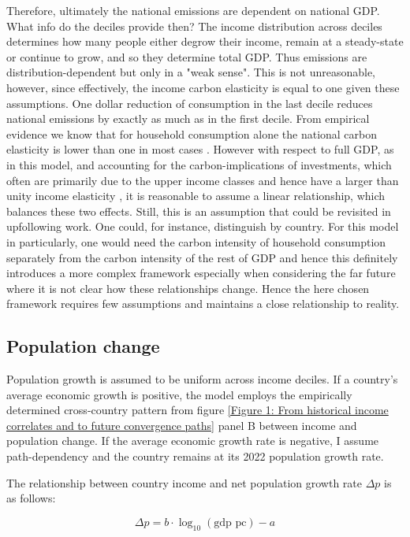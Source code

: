 \documentclass{article}
\begin{document}
Therefore, ultimately the national emissions are dependent on national GDP. What info do the deciles provide then? The income distribution across deciles determines how many people either degrow their income, remain at a steady-state or continue to grow, and so they determine total GDP. Thus emissions are distribution-dependent but only in a "weak sense". This is not unreasonable, however, since effectively, the income carbon elasticity is equal to one given these assumptions. One dollar reduction of consumption in the last decile reduces national emissions by exactly as much as in the first decile. From empirical evidence we know that for household consumption alone the national carbon elasticity is lower than one in most cases \parencite{pottier2022expenditure}.  However with respect to full GDP, as in this model, and accounting for the carbon-implications of investments, which often are primarily due to the upper income classes and hence have a larger than unity income elasticity \parencite{chancel2022global}, it is reasonable to assume a linear relationship, which balances these two effects. Still, this is an assumption that could be revisited in upfollowing work. One could, for instance, distinguish by country. For this model in particularly, one would need the carbon intensity of household consumption separately from the carbon intensity of the rest of GDP and hence this definitely introduces a more complex framework especially when considering the far future where it is not clear how these relationships change. Hence the here chosen framework requires few assumptions and maintains a close relationship to reality.

\subsection{Population change}\label{Population change}

Population growth is assumed to be uniform across income deciles. If a country's average economic growth is positive, the model employs the empirically determined cross-country pattern from figure \ref{Figure 1: From historical income correlates and to future convergence paths} panel B between income and population change. If the average economic growth rate is negative, I assume path-dependency and the country remains at its 2022 population growth rate.  

The relationship between country income and net population growth rate \(\Delta{p}\) is as follows:

\begin{equation}
\Delta{p} = b \cdot \log_{10}(\text{gdp pc}) - a
\end{equation}
\end{document}

